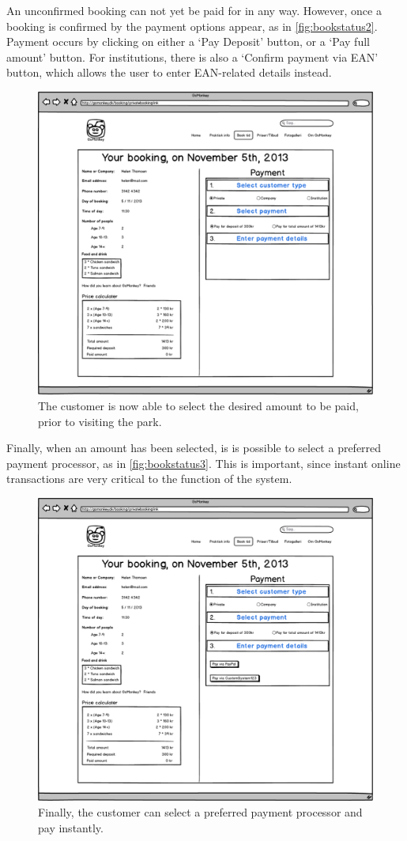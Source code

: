 An unconfirmed booking can not yet be paid for in any way. However, once a 
booking is confirmed by \gomonkey{} the payment options appear, as in 
\autoref{fig:bookstatus2}. Payment occurs 
by clicking on either a ‘Pay Deposit’ button, or a ‘Pay full amount’ button. 
For institutions, there is also a ‘Confirm payment via EAN’ button, which 
allows the user to enter EAN-related details instead.

\begin{figure}[htbp]
    \centering
        \includegraphics[width=.6\textwidth]{figures/mockup/booking_payment_2.png}
	    \caption{The customer is now able to select the desired amount to be paid, prior to visiting the park.}
        \label{fig:bookstatus2}
\end{figure}

Finally, when an amount has been selected, is is possible to select a preferred
payment processor, as in \autoref{fig:bookstatus3}. This is important, since 
instant online transactions are very
critical to the function of the system.

\begin{figure}[htbp]
    \centering
        \includegraphics[width=.6\textwidth]{figures/mockup/booking_payment_3.png}
	    \caption{Finally, the customer can select a preferred payment processor and pay instantly.}
        \label{fig:bookstatus3}
\end{figure}

